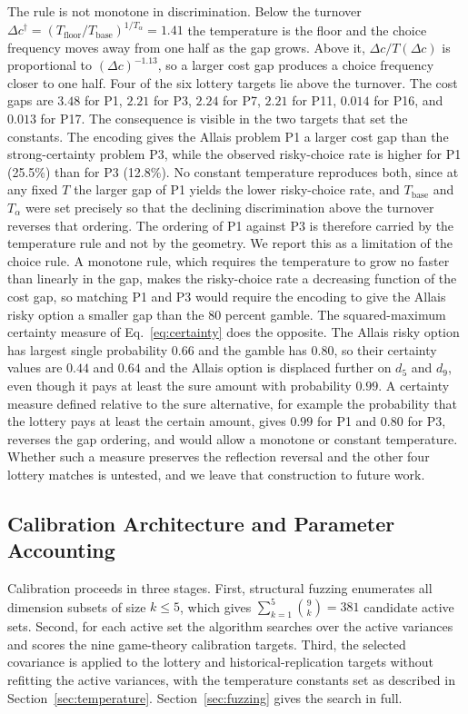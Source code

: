 \documentclass[journal]{IEEEtran}
\begin{document}
The rule is not monotone in discrimination.
Below the turnover $\Delta c^{\dagger}=(T_{\text{floor}}/T_{\text{base}})^{1/T_\alpha}=1.41$ the temperature is the floor and the choice frequency moves away from one half as the gap grows.
Above it, $\Delta c/T(\Delta c)$ is proportional to $(\Delta c)^{-1.13}$, so a larger cost gap produces a choice frequency closer to one half.
Four of the six lottery targets lie above the turnover.
The cost gaps are $3.48$ for P1, $2.21$ for P3, $2.24$ for P7, $2.21$ for P11, $0.014$ for P16, and $0.013$ for P17.
The consequence is visible in the two targets that set the constants.
The encoding gives the Allais problem P1 a larger cost gap than the strong-certainty problem P3, while the observed risky-choice rate is higher for P1 (25.5\%) than for P3 (12.8\%).
No constant temperature reproduces both, since at any fixed $T$ the larger gap of P1 yields the lower risky-choice rate, and $T_{\text{base}}$ and $T_\alpha$ were set precisely so that the declining discrimination above the turnover reverses that ordering.
The ordering of P1 against P3 is therefore carried by the temperature rule and not by the geometry.
We report this as a limitation of the choice rule.
A monotone rule, which requires the temperature to grow no faster than linearly in the gap, makes the risky-choice rate a decreasing function of the cost gap, so matching P1 and P3 would require the encoding to give the Allais risky option a smaller gap than the 80 percent gamble.
The squared-maximum certainty measure of Eq.~\eqref{eq:certainty} does the opposite.
The Allais risky option has largest single probability $0.66$ and the gamble has $0.80$, so their certainty values are $0.44$ and $0.64$ and the Allais option is displaced further on $d_5$ and $d_9$, even though it pays at least the sure amount with probability $0.99$.
A certainty measure defined relative to the sure alternative, for example the probability that the lottery pays at least the certain amount, gives $0.99$ for P1 and $0.80$ for P3, reverses the gap ordering, and would allow a monotone or constant temperature.
Whether such a measure preserves the reflection reversal and the other four lottery matches is untested, and we leave that construction to future work.

\subsection{Calibration Architecture and Parameter Accounting}
\label{sec:calibration}

Calibration proceeds in three stages.
First, structural fuzzing enumerates all dimension subsets of size $k\leq5$, which gives $\sum_{k=1}^5 \binom{9}{k}=381$ candidate active sets.
Second, for each active set the algorithm searches over the active variances and scores the nine game-theory calibration targets.
Third, the selected covariance is applied to the lottery and historical-replication targets without refitting the active variances, with the temperature constants set as described in Section~\ref{sec:temperature}.
Section~\ref{sec:fuzzing} gives the search in full.
\end{document}
